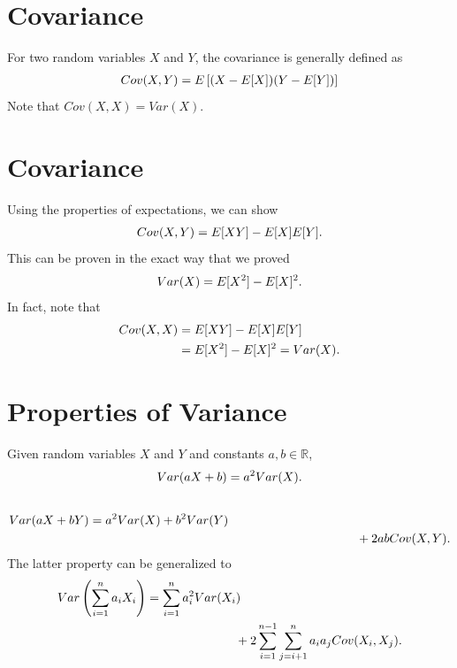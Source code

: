 \documentclass[letterpaper,10pt,english]{sphinxmanual}
\begin{document}
\section{Covariance}
\label{probability:covariance}
For two random variables $X$ and $Y$, the covariance is
generally defined as
\begin{gather}
\begin{split}Cov(X,Y)  = E\left[(X-E[X])(Y-E[Y])\right]\end{split}\notag
\end{gather}
Note that $Cov(X,X) = Var(X)$.


\section{Covariance}
\label{probability:id3}
Using the properties of expectations, we can show
\begin{gather}
\begin{split}Cov(X,Y) = E[XY] - E[X]E[Y].\end{split}\notag
\end{gather}
This can be proven in the exact way that we proved
\begin{gather}
\begin{split}Var(X) = E[X^2] - E[X]^2.\end{split}\notag
\end{gather}
In fact, note that
\begin{gather}
\begin{split}Cov(X,X) & = E[XY] - E[X]E[Y] \\
& = E[X^2] - E[X]^2 = Var(X).\end{split}\notag
\end{gather}

\section{Properties of Variance}
\label{probability:properties-of-variance}
Given random variables $X$ and $Y$ and constants
$a,b \in \mathbb{R}$,
\begin{gather}
\begin{split}Var(aX + b) = a^2Var(X).\end{split}\notag\\\begin{split}\end{split}\notag
\end{gather}\begin{gather}
\begin{split}Var(aX+bY) & = a^2Var(X) + b^2Var(Y) \\
& \hspace{3in} + 2abCov(X,Y).\end{split}\notag
\end{gather}
The latter property can be generalized to
\begin{gather}
\begin{split}Var\left(\sum_{i=1}^n a_i X_i \right) & =
\sum_{i=1}^n a_i^2Var(X_i) \\
& \hspace{1in} + 2 \sum_{i=1}^{n-1} \sum_{j=i+1}^n
a_i a_j Cov(X_i, X_j).\end{split}\notag
\end{gather}
\end{document}
